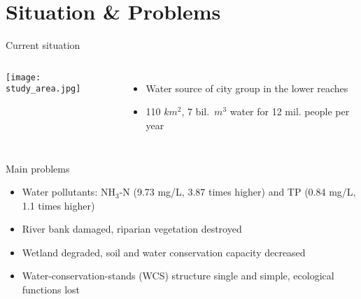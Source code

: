 \section{Situation \& Problems}
\begin{frame}[t]{Current situation}
\begin{columns}[T]
\texttt{[image: study\_area.jpg]}
	\begin{itemize}		
		\item Water source of city group in the lower reaches
		\item 110 $km^2$, 7 bil.\ $m^3$ water for \alert{12 mil.} people per year
	\end{itemize}
\end{columns}
 \end{frame}

\begin{frame}[t]{Main problems}
	\begin{itemize}[<+- | alert@+>]
		\item Water pollutants: NH$_3$-N (9.73 mg/L, 3.87 times higher) and TP (0.84 mg/L, 1.1 times higher)
		\item River bank damaged, riparian vegetation destroyed
		\item Wetland degraded, soil and water conservation capacity decreased
		\item Water-conservation-stands (WCS) structure single and simple, ecological functions lost
	\end{itemize}

\begin{columns}[T]
		
	
\end{columns}
\end{frame}